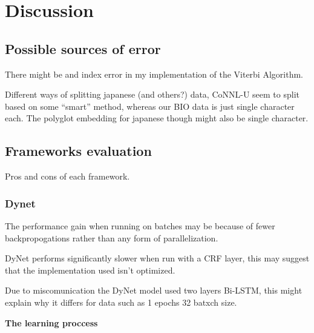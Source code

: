 
\section{Discussion}

\subsection{Possible sources of error}

There might be and index error in my implementation of the Viterbi Algorithm.

Different ways of splitting japanese (and others?) data, CoNNL-U seem to split
based on some ``smart'' method, whereas our BIO data is just single character
each. The polyglot embedding for japanese though might also be single character.

\subsection{Frameworks evaluation}
\label{subsec:frameworks}

Pros and cons of each framework.

\subsubsection{Dynet}

The performance gain when running on batches may be because of fewer
backpropogations rather than any form of parallelization.

DyNet performs significantly slower when run with a CRF layer, this may suggest
that the implementation used isn't optimized. 

Due to miscomunication the DyNet model used two layers Bi-LSTM, this might
explain why it differs for data such as 1 epochs 32 batxch size.


\textbf{The learning proccess}

